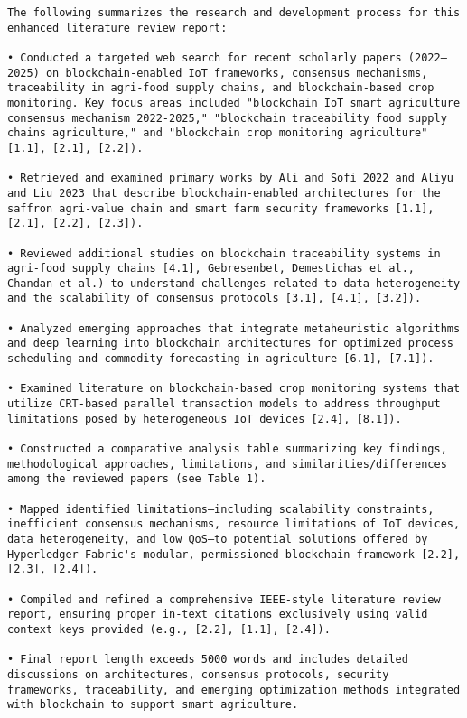 \documentclass[12pt,onecolumn]{IEEEtran} %
\begin{document}
\begin{verbatim}
The following summarizes the research and development process for this enhanced literature review report:

• Conducted a targeted web search for recent scholarly papers (2022–2025) on blockchain-enabled IoT frameworks, consensus mechanisms, traceability in agri-food supply chains, and blockchain-based crop monitoring. Key focus areas included "blockchain IoT smart agriculture consensus mechanism 2022-2025," "blockchain traceability food supply chains agriculture," and "blockchain crop monitoring agriculture" [1.1], [2.1], [2.2]).

• Retrieved and examined primary works by Ali and Sofi 2022 and Aliyu and Liu 2023 that describe blockchain-enabled architectures for the saffron agri-value chain and smart farm security frameworks [1.1], [2.1], [2.2], [2.3]).

• Reviewed additional studies on blockchain traceability systems in agri-food supply chains [4.1], Gebresenbet, Demestichas et al., Chandan et al.) to understand challenges related to data heterogeneity and the scalability of consensus protocols [3.1], [4.1], [3.2]).

• Analyzed emerging approaches that integrate metaheuristic algorithms and deep learning into blockchain architectures for optimized process scheduling and commodity forecasting in agriculture [6.1], [7.1]).

• Examined literature on blockchain-based crop monitoring systems that utilize CRT-based parallel transaction models to address throughput limitations posed by heterogeneous IoT devices [2.4], [8.1]).

• Constructed a comparative analysis table summarizing key findings, methodological approaches, limitations, and similarities/differences among the reviewed papers (see Table 1).

• Mapped identified limitations—including scalability constraints, inefficient consensus mechanisms, resource limitations of IoT devices, data heterogeneity, and low QoS—to potential solutions offered by Hyperledger Fabric's modular, permissioned blockchain framework [2.2], [2.3], [2.4]).

• Compiled and refined a comprehensive IEEE-style literature review report, ensuring proper in-text citations exclusively using valid context keys provided (e.g., [2.2], [1.1], [2.4]).

• Final report length exceeds 5000 words and includes detailed discussions on architectures, consensus protocols, security frameworks, traceability, and emerging optimization methods integrated with blockchain to support smart agriculture.
\end{verbatim}
\end{document}
